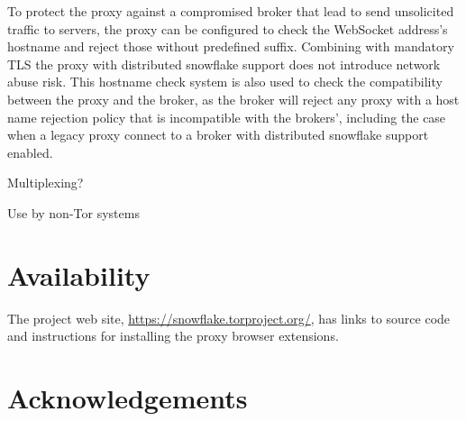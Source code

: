 \documentclass[letterpaper,twocolumn]{article}
\begin{document}
To protect the proxy against a compromised broker that lead to send unsolicited traffic to servers, the proxy can be configured to check the WebSocket address's hostname and reject those without predefined suffix. Combining with mandatory TLS the proxy with distributed snowflake support does not introduce network abuse risk. This hostname check system is also used to check the compatibility between the proxy and the broker, as the broker will reject any proxy with a host name rejection policy that is incompatible with the brokers', including the case when a legacy proxy connect to a broker with distributed snowflake support enabled.

Multiplexing?

Use by non-Tor systems

\section*{Availability}

The project web site,
\url{https://snowflake.torproject.org/},
has links to source code
and instructions for installing the proxy browser extensions.

\section*{Acknowledgements}
\end{document}
